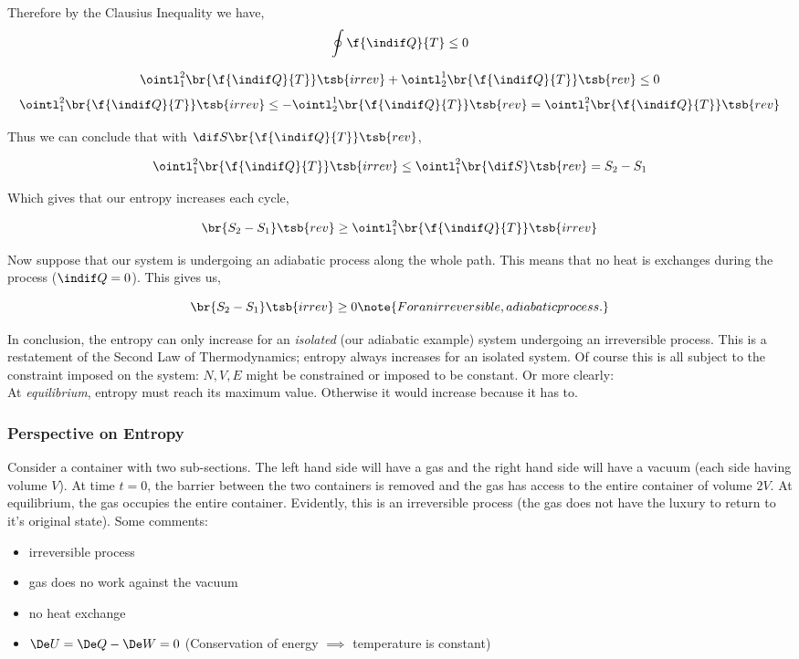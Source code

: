 \documentclass{article}
\begin{document}
Therefore by the Clausius Inequality we have,
\[ \oint \f{\indif Q}{T} \leq 0 \]

\[ \ointl_1^2 \br{\f{\indif Q}{T}}\tsb{irrev} + \ointl_2^1 \br{\f{\indif Q}{T}}\tsb{rev} \leq 0 \]
\[ \ointl_1^2 \br{\f{\indif Q}{T}}\tsb{irrev} \leq - \ointl_2^1 \br{\f{\indif Q}{T}}\tsb{rev} = \ointl_1^2 \br{\f{\indif Q}{T}}\tsb{rev} \]

Thus we can conclude that with $\dif S \br{\f{\indif Q}{T}}\tsb{rev}$,

\[ \ointl_1^2 \br{\f{\indif Q}{T}}\tsb{irrev} \leq \ointl_1^2 \br{\dif S}\tsb{rev} = S_2 - S_1 \]

Which gives that our entropy increases each cycle,

\[ \br{S_2 - S_1}\tsb{rev} \geq \ointl_1^2 \br{\f{\indif Q}{T}}\tsb{irrev} \]

Now suppose that our system is undergoing an adiabatic process along the whole path. This means that no heat is exchanges during the process ($\indif Q = 0$). This gives us,

\[ \br{S_2 - S_1}\tsb{irrev} \geq 0 \note{For an irreversible, adiabatic process.}\]

In conclusion, the entropy can only increase for an \textit{isolated} (our adiabatic example) system undergoing an irreversible process. This is a restatement of the Second Law of Thermodynamics; entropy always increases for an isolated system. Of course this is all subject to the constraint imposed on the system: $N, V, E$ might be constrained or imposed to be constant. Or more clearly: \\

At \textit{equilibrium}, entropy must reach its maximum value. Otherwise it would increase because it has to.

\subsubsection{Perspective on Entropy}

Consider a container with two sub-sections. The left hand side will have a gas and the right hand side will have a vacuum (each side having volume $V$). At time $t=0$, the barrier between the two containers is removed and the gas has access to the entire container of volume $2V$. At equilibrium, the gas occupies the entire container. Evidently, this is an irreversible process (the gas does not have the luxury to return to it's original state). Some comments:

\begin{itemize}
  \item irreversible process
  \item gas does no work against the vacuum
  \item no heat exchange
  \item $\De U = \De Q - \De W = 0$ (Conservation of energy $\implies$ temperature is constant)
\end{itemize}
\end{document}
